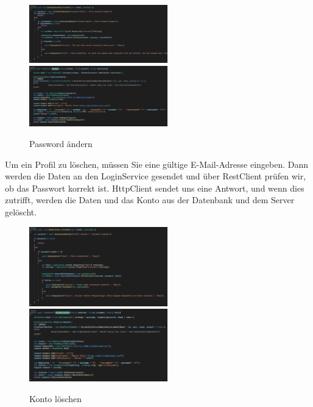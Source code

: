 \begin{figure}[h]
    \begin{center}
    \includegraphics[width=6cm]{pics/Xamarin Frontend/pass1.png}\hfill
    \includegraphics[width=6cm]{pics/Xamarin Frontend/pass2.png}
    \caption[MyAccount]{Password ändern}
    \end{center}
\end{figure}
\newline
Um ein Profil zu löschen, müssen Sie eine gültige E-Mail-Adresse eingeben. Dann werden die Daten an den LoginService gesendet und über RestClient prüfen wir, ob das Passwort korrekt ist. HttpClient sendet uns eine Antwort, und wenn dies zutrifft, werden die Daten und das Konto aus der Datenbank und dem Server gelöscht.
\begin{figure}[h]
    \begin{center}
    \includegraphics[width=6cm]{pics/Xamarin Frontend/accDelete.png}\hfill
    \includegraphics[width=6cm]{pics/Xamarin Frontend/accDelete2.png}
    \caption[MyAccount]{Konto löschen}
    \end{center}
\end{figure}
\newpage


